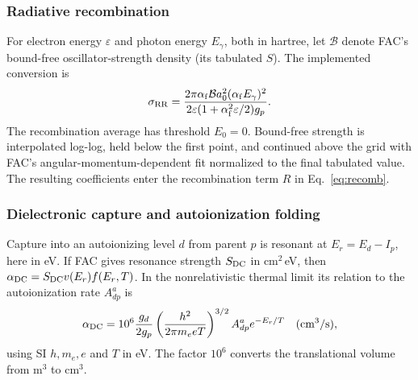 \documentclass[11pt,a4paper]{article}
\numberwithin{equation}{section}
\begin{document}
\subsubsection{Radiative recombination}

For electron energy $\varepsilon$ and photon energy $E_\gamma$, both in
hartree, let $\mathcal B$ denote FAC's bound-free oscillator-strength
density (its tabulated $S$). The implemented conversion is
\begin{equation}
 \sigma_{\rm RR}
 =\frac{2\pi\alpha_{\rm f}\mathcal B a_0^2
                (\alpha_{\rm f}E_\gamma)^2}
        {2\varepsilon(1+\alpha_{\rm f}^2\varepsilon/2)g_p}.
\end{equation}
The recombination average has threshold $E_0=0$. Bound-free strength
is interpolated log-log, held below the first point, and continued
above the grid with FAC's angular-momentum-dependent fit normalized
to the final tabulated value. The resulting coefficients enter
the recombination term $R$ in Eq.~\eqref{eq:recomb}.

\subsubsection{Dielectronic capture and autoionization folding}

Capture into an autoionizing level $d$ from parent $p$ is resonant at
$E_r=E_d-I_p$, here in eV. If FAC gives resonance strength
$S_{\rm DC}$ in cm$^2$\,eV, then
$\alpha_{\rm DC}=S_{\rm DC}v(E_r)f(E_r,T)$. In the nonrelativistic
thermal limit its relation to the autoionization rate $A^a_{dp}$ is
\begin{equation}
 \alpha_{\rm DC}=10^6\frac{g_d}{2g_p}
 \left(\frac{h^2}{2\pi m_e eT}\right)^{3/2}
 A^a_{dp}e^{-E_r/T}\quad\text{(cm$^3$/s)},
\end{equation}
using SI $h,m_e,e$ and $T$ in eV. The factor $10^6$ converts the
translational volume from m$^3$ to cm$^3$.
\end{document}

